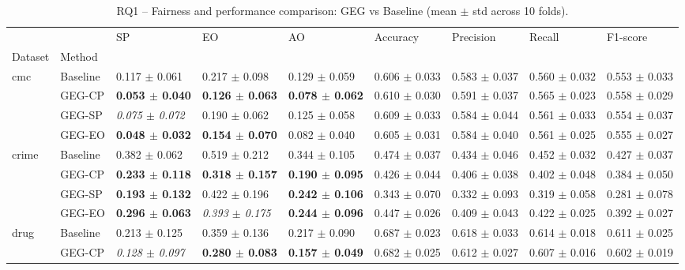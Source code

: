 \begin{table}
\caption{RQ1 -- Fairness and performance comparison: GEG vs Baseline (mean $\pm$ std across 10 folds).}
\label{tab:rq1_results}
\begin{tabular}{lllllllll}
\toprule
 &  & SP & EO & AO & Accuracy & Precision & Recall & F1-score \\
Dataset & Method &  &  &  &  &  &  &  \\
\midrule
\multirow[t]{4}{*}{cmc} & Baseline & 0.117 $\pm$ 0.061 & 0.217 $\pm$ 0.098 & 0.129 $\pm$ 0.059 & 0.606 $\pm$ 0.033 & 0.583 $\pm$ 0.037 & 0.560 $\pm$ 0.032 & 0.553 $\pm$ 0.033 \\
 & GEG-CP & \textbf{0.053 $\pm$ 0.040} & \textbf{0.126 $\pm$ 0.063} & \textbf{0.078 $\pm$ 0.062} & 0.610 $\pm$ 0.030 & 0.591 $\pm$ 0.037 & 0.565 $\pm$ 0.023 & 0.558 $\pm$ 0.029 \\
 & GEG-SP & \textit{0.075 $\pm$ 0.072} & 0.190 $\pm$ 0.062 & 0.125 $\pm$ 0.058 & 0.609 $\pm$ 0.033 & 0.584 $\pm$ 0.044 & 0.561 $\pm$ 0.033 & 0.554 $\pm$ 0.037 \\
 & GEG-EO & \textbf{0.048 $\pm$ 0.032} & \textbf{0.154 $\pm$ 0.070} & 0.082 $\pm$ 0.040 & 0.605 $\pm$ 0.031 & 0.584 $\pm$ 0.040 & 0.561 $\pm$ 0.025 & 0.555 $\pm$ 0.027 \\
\cline{1-9}
\multirow[t]{4}{*}{crime} & Baseline & 0.382 $\pm$ 0.062 & 0.519 $\pm$ 0.212 & 0.344 $\pm$ 0.105 & 0.474 $\pm$ 0.037 & 0.434 $\pm$ 0.046 & 0.452 $\pm$ 0.032 & 0.427 $\pm$ 0.037 \\
 & GEG-CP & \textbf{0.233 $\pm$ 0.118} & \textbf{0.318 $\pm$ 0.157} & \textbf{0.190 $\pm$ 0.095} & 0.426 $\pm$ 0.044 & 0.406 $\pm$ 0.038 & 0.402 $\pm$ 0.048 & 0.384 $\pm$ 0.050 \\
 & GEG-SP & \textbf{0.193 $\pm$ 0.132} & 0.422 $\pm$ 0.196 & \textbf{0.242 $\pm$ 0.106} & 0.343 $\pm$ 0.070 & 0.332 $\pm$ 0.093 & 0.319 $\pm$ 0.058 & 0.281 $\pm$ 0.078 \\
 & GEG-EO & \textbf{0.296 $\pm$ 0.063} & \textit{0.393 $\pm$ 0.175} & \textbf{0.244 $\pm$ 0.096} & 0.447 $\pm$ 0.026 & 0.409 $\pm$ 0.043 & 0.422 $\pm$ 0.025 & 0.392 $\pm$ 0.027 \\
\cline{1-9}
\multirow[t]{4}{*}{drug} & Baseline & 0.213 $\pm$ 0.125 & 0.359 $\pm$ 0.136 & 0.217 $\pm$ 0.090 & 0.687 $\pm$ 0.023 & 0.618 $\pm$ 0.033 & 0.614 $\pm$ 0.018 & 0.611 $\pm$ 0.025 \\
 & GEG-CP & \textit{0.128 $\pm$ 0.097} & \textbf{0.280 $\pm$ 0.083} & \textbf{0.157 $\pm$ 0.049} & 0.682 $\pm$ 0.025 & 0.612 $\pm$ 0.027 & 0.607 $\pm$ 0.016 & 0.602 $\pm$ 0.019 \\

\end{tabular}
\end{table}
